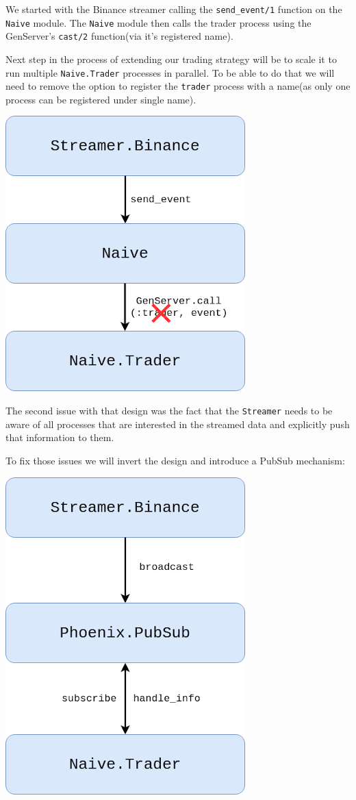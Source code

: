 \documentclass[
  oneside]{book}
\begin{document}
We started with the Binance streamer calling the \texttt{send\_event/1} function on the \texttt{Naive} module. The \texttt{Naive} module then calls the trader process using the GenServer's \texttt{cast/2} function(via it's registered name).

Next step in the process of extending our trading strategy will be to scale it to run multiple \texttt{Naive.Trader} processes in parallel. To be able to do that we will need to remove the option to register the \texttt{trader} process with a name(as only one process can be registered under single name).

\includegraphics{images/chapter_03_02_current_situation_failed.png}

The second issue with that design was the fact that the \texttt{Streamer} needs to be aware of all processes that are interested in the streamed data and explicitly push that information to them.

To fix those issues we will invert the design and introduce a PubSub mechanism:

\includegraphics{images/chapter_03_03_phoenix_pubsub.png}
\end{document}

